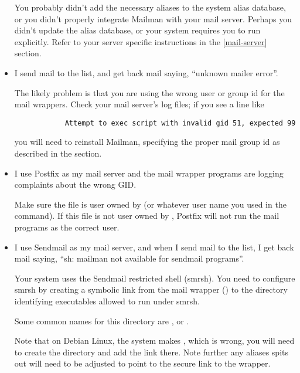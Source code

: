 \documentclass{howto}
\begin{document}
\begin{itemize}
       You probably didn't add the necessary aliases to the
      system alias database, or you didn't properly integrate Mailman with
      your mail server.  Perhaps you didn't update the alias database, or your
      system requires you to run  explicitly.  Refer to
      your server specific instructions in the \ref{mail-server} section.

\item {} I send mail to the list, and get back mail saying,
      ``unknown mailer error''.

       The likely problem is that you are using the wrong
      user or group id for the mail wrappers.  Check your mail server's log
      files; if you see a line like

      \begin{verbatim}
            Attempt to exec script with invalid gid 51, expected 99
      \end{verbatim}

      you will need to reinstall Mailman, specifying the proper mail group id
      as described in the \label{building} section.

\item {} I use Postfix as my mail server and the mail wrapper
      programs are logging complaints about the wrong GID.

       Make sure the 
      file is user owned by  (or whatever user name you used
      in the  command).  If this file is not user owned by
      , Postfix will not run the mail programs as the correct
      user.

\item {} I use Sendmail as my mail server, and when I send mail
      to the list, I get back mail saying, ``sh: mailman not available for
      sendmail programs''.

       Your system uses the Sendmail restricted shell
      (smrsh). You need to configure smrsh by creating a symbolic link from
      the mail wrapper () to the directory
      identifying executables allowed to run under smrsh.

      Some common names for this directory are ,
       or .

      Note that on Debian Linux, the system makes ,
      which is wrong, you will need to create the directory
       and add the link there.  Note further any
      aliases  spits out will need to be adjusted to point
      to the secure link to the wrapper.


\end{itemize}
\end{document}
